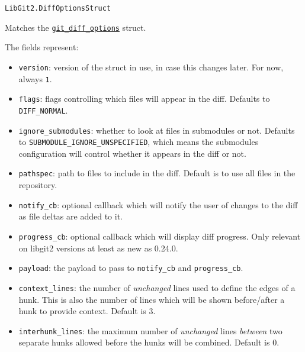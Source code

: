 \begin{adjustwidth}{2em}{0pt}


\begin{verbatim}
LibGit2.DiffOptionsStruct
\end{verbatim}

Matches the \href{https://libgit2.org/libgit2/\#HEAD/type/git\_diff\_options}{\texttt{git\_diff\_options}} struct.

The fields represent:

\begin{itemize}
\item \texttt{version}: version of the struct in use, in case this changes later. For now, always \texttt{1}.


\item \texttt{flags}: flags controlling which files will appear in the diff. Defaults to \texttt{DIFF\_NORMAL}.


\item \texttt{ignore\_submodules}: whether to look at files in submodules or not. Defaults to \texttt{SUBMODULE\_IGNORE\_UNSPECIFIED}, which means the submodule{\textquotesingle}s configuration will control  whether it appears in the diff or not.


\item \texttt{pathspec}: path to files to include in the diff. Default is to use all files in the repository.


\item \texttt{notify\_cb}: optional callback which will notify the user of changes to the diff as file deltas are  added to it.


\item \texttt{progress\_cb}: optional callback which will display diff progress. Only relevant on libgit2 versions  at least as new as 0.24.0.


\item \texttt{payload}: the payload to pass to \texttt{notify\_cb} and \texttt{progress\_cb}.


\item \texttt{context\_lines}: the number of \emph{unchanged} lines used to define the edges of a hunk.  This is also the number of lines which will be shown before/after a hunk to provide  context. Default is 3.


\item \texttt{interhunk\_lines}: the maximum number of \emph{unchanged} lines \emph{between} two separate  hunks allowed before the hunks will be combined. Default is 0.



\end{itemize}
\end{adjustwidth}
